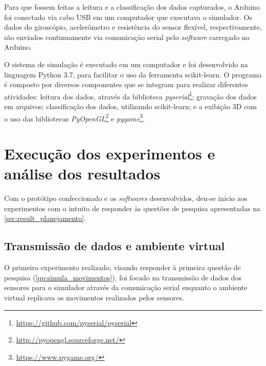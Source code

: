 Para que fossem feitas a leitura e a classificação dos dados capturados, o Arduino foi conectado via cabo USB em um computador que executava o simulador. Os dados do giroscópio, acelerômetro e resistência do sensor flexível, respectivamente, são enviados continuamente via comunicação serial pelo \textit{software} carregado no Arduino.



O sistema de simulação é executado em um computador e foi desenvolvido na linguagem Python 3.7, para facilitar o uso da ferramenta scikit-learn. O programa é composto por diversos componentes que se integram para realizar diferentes atividades: leitura dos dados, através da biblioteca \textit{pyserial}\footnote{\url{https://github.com/pyserial/pyserial}}; gravação dos dados em arquivos; classificação dos dados, utilizando scikit-learn; e a exibição 3D com o uso das bibliotecas \textit{PyOpenGL}\footnote{\url{http://pyopengl.sourceforge.net/}} e \textit{pygame}\footnote{\url{https://www.pygame.org/}}.

%
\section{Execução dos experimentos e análise dos resultados}\label{sec:result_execucao}
%
Com o protótipo confeccionado e os \textit{softwares} desenvolvidos, deu-se início aos experimentos com o intuito de responder às questões de pesquisa apresentadas na \autoref{sec:result_planejamento}.

\subsection{Transmissão de dados e ambiente virtual}

O primeiro experimento realizado, visando responder à primeira questão de pesquisa (\ref{qp:simula_movimentos}), foi focado na transmissão de dados dos sensores para o simulador através da comunicação serial enquanto o ambiente virtual replicava os movimentos realizados pelos sensores.


